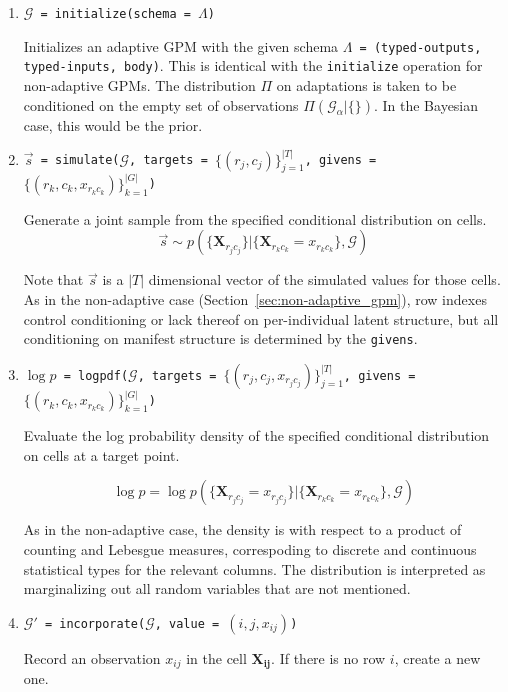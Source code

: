 \documentclass[10pt,letterpaper]{article}
\newcommand{\set}[1]{\{#1\}}
\newcommand{\G}{\mathcal{G}}
\begin{document}
\begin{enumerate}

\item \texttt{$\G$ = initialize(schema = $\Lambda$)}

    Initializes an adaptive GPM with the given schema \texttt{$\Lambda$ =
    (typed-outputs, typed-inputs, body)}.  This is identical with the
    \texttt{initialize} operation for non-adaptive GPMs.  The distribution $\Pi$
    on adaptations is taken to be conditioned on the empty set of observations
    $\Pi(\G_\alpha|\{\})$.  In the Bayesian case, this would be the prior.

\item \texttt{$\vec{s}$ =
    simulate($\G$, targets = $\set{(r_j,c_j)}_{j=1}^{|T|}$, givens
    = $\set{(r_k, c_k, x_{r_kc_k})}_{k=1}^{|G|}$)}

    Generate a joint sample from the specified conditional
    distribution on cells.
    $$
    \vec{s} \sim p( \set{ \mathbf{X}_{r_jc_j} } |
    \set{ \mathbf{X}_{r_kc_k} = x_{r_kc_k} }, \G)
    $$

    Note that $\vec{s}$ is a $|T|$ dimensional vector of the simulated
    values for those cells.  As in the non-adaptive case
    (Section~\ref{sec:non-adaptive_gpm}), row indexes control conditioning
    or lack thereof on per-individual latent structure, but all conditioning
    on manifest structure is determined by the \texttt{givens}.
    
\item \texttt{$\log p$ =
    logpdf($\G$, targets = $\set{(r_j, c_j, x_{r_jc_j})}_{j=1}^{|T|}$,
    givens = $\set{(r_k, c_k, x_{r_kc_k})}_{k=1}^{|G|}$)}

    Evaluate the log probability density of the specified conditional
    distribution on cells at a target point.

    $$
    \log p = \log p( \set{ \mathbf{X}_{r_jc_j} = x_{r_jc_j} } |
    \set{ \mathbf{X}_{r_kc_k} = x_{r_kc_k} }, \G)
    $$

    As in the non-adaptive case, the density is with respect to a
    product of counting and Lebesgue measures, correspoding to
    discrete and continuous statistical types for the relevant
    columns.  The distribution is interpreted as marginalizing out all
    random variables that are not mentioned.

\item \texttt{$\G'$ = incorporate($\G$, value = $(i, j, x_{ij})$)}

    Record an observation $x_{ij}$ in the cell $\mathbf{X_{ij}}$.
    If there is no row $i$, create a new one.


\end{enumerate}
\end{document}
